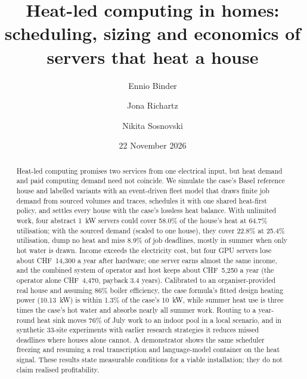 \documentclass[11pt,a4paper]{article}
\title{Heat-led computing in homes:\\
  scheduling, sizing and economics of servers that heat a house}
\author{Ennio Binder \and Jona Richartz \and Nikita Sosnovski}
\date{22 November 2026}
\begin{document}
\maketitle

\begin{abstract}
Heat-led computing promises two services from one electrical input, but heat demand and paid
computing demand need not coincide. We simulate the case's Basel reference house and labelled
variants with an event-driven fleet model that draws finite job demand from sourced volumes and
traces, schedules it with one shared heat-first policy, and settles every house with the case's
lossless heat balance. With unlimited work, four abstract \qty{1}{kW} servers could cover 58.0\% of
the house's heat at 64.7\% utilisation; with the sourced demand (scaled to one house), they cover
22.8\% at 25.4\% utilisation, dump no heat and miss 8.9\% of job deadlines, mostly in summer when
only hot water is drawn. Income exceeds the electricity cost, but four GPU servers lose about
CHF~14,300 a year after hardware; one server earns almost the same income, and the combined system
of operator and host keeps about CHF~5,250 a year (the operator alone CHF~4,470, payback 3.4 years). Calibrated to an organiser-provided real house and assuming 86\% boiler efficiency,
the case formula's fitted design heating power (\qty{10.13}{kW}) is within 1.3\% of the case's \qty{10}{kW}, while summer heat use is three
times the case's hot water and absorbs nearly all summer work. Routing to a year-round heat sink
moves 76\% of July work to an indoor pool in a local scenario, and in synthetic 33-site experiments
with earlier research strategies it reduces missed deadlines where houses alone cannot. A demonstrator shows the same scheduler
freezing and resuming a real transcription and language-model container on the heat signal. These
results state measurable conditions for a viable installation; they do not claim realised
profitability.
\end{abstract}









\clearpage %



\appendix

\clearpage %



\end{document}
